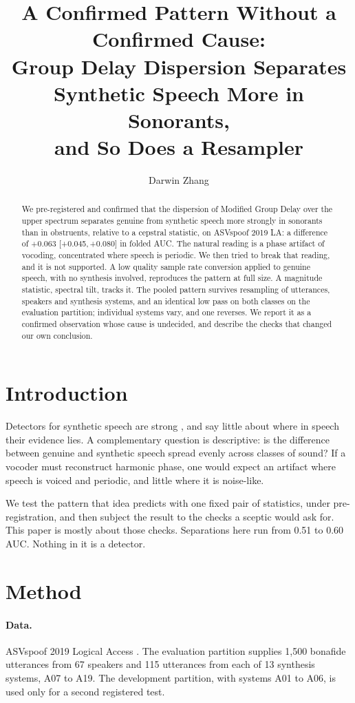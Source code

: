 \documentclass[11pt]{article}
\title{A Confirmed Pattern Without a Confirmed Cause:\\
Group Delay Dispersion Separates Synthetic Speech More in Sonorants,\\
and So Does a Resampler}
\author{Darwin Zhang}
\newcommand{\ci}[2]{[#1,\,#2]}
\begin{document}
\maketitle

\begin{abstract}
We pre-registered and confirmed that the dispersion of Modified Group Delay over
the upper spectrum separates genuine from synthetic speech more strongly in
sonorants than in obstruents, relative to a cepstral statistic, on ASVspoof
2019 LA: a difference of $+0.063$ \ci{+0.045}{+0.080} in folded AUC. The natural
reading is a phase artifact of vocoding, concentrated where speech is periodic.
We then tried to break that reading, and it is not supported. A low quality sample
rate conversion applied to genuine speech, with no synthesis involved,
reproduces the pattern at full size. A magnitude statistic, spectral tilt,
tracks it. The pooled pattern survives resampling of utterances, speakers and
synthesis systems, and an identical low pass on both classes on the
evaluation partition; individual systems vary, and one reverses. We report it as a confirmed observation whose cause is
undecided, and describe the checks that changed our own conclusion.
\end{abstract}

\section{Introduction}

Detectors for synthetic speech are strong \citep{jung2022aasist}, and say little
about where in speech their evidence lies. A complementary question is
descriptive: is the difference between genuine and synthetic speech spread
evenly across classes of sound? If a vocoder must reconstruct harmonic phase,
one would expect an artifact where speech is voiced and periodic, and little
where it is noise-like.

We test the pattern that idea predicts with one fixed pair of statistics, under
pre-registration, and then subject the result to the checks a sceptic would
ask for. This paper is mostly about those checks. Separations here run from
0.51 to 0.60 AUC. Nothing in it is a detector.

\section{Method}

\paragraph{Data.} ASVspoof 2019 Logical Access \citep{wang2020asvspoof}. The
evaluation partition supplies 1,500 bonafide utterances from 67 speakers and
115 utterances from each of 13 synthesis systems, A07 to A19. The development
partition, with systems A01 to A06, is used only for a second registered test.
\end{document}
